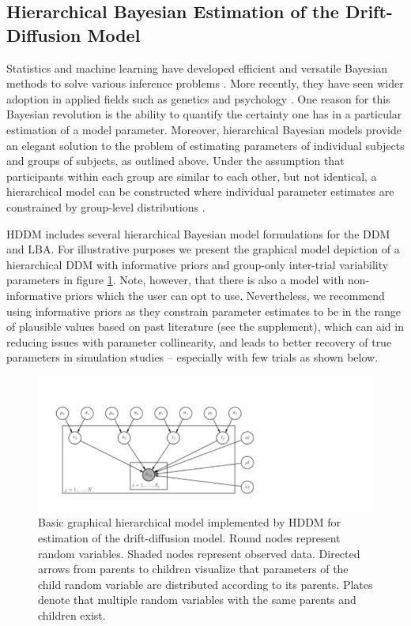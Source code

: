 \documentclass[letterpaper,10pt,english]{article}
\begin{document}
\subsection*{Hierarchical Bayesian Estimation of the Drift-Diffusion
Model}
\label{methods:hierarchical-bayesian-estimation}
Statistics and machine learning have developed efficient and versatile
Bayesian methods to solve various inference problems
\citep{Poirier06}. More recently, they have seen wider adoption in
applied fields such as genetics \citep{StephensBalding09} and
psychology \citep{ClemensDeSelenEtAl11}. One reason for this Bayesian
revolution is the ability to quantify the certainty one has in a
particular estimation of a model parameter. Moreover, hierarchical
Bayesian models provide an elegant solution to the problem of
estimating parameters of individual subjects and groups of subjects,
as outlined above. Under the assumption that participants within each
group are similar to each other, but not identical, a hierarchical
model can be constructed where individual parameter estimates are
constrained by group-level distributions
\citep{NilssonRieskampWagenmakers11,ShiffrinLeeKim08}.

HDDM includes several hierarchical Bayesian model formulations for the DDM and LBA. For illustrative purposes we present the graphical model depiction of a hierarchical DDM with informative priors and group-only inter-trial variability parameters in figure \ref{fig.graphical}. Note, however, that there is also a model with non-informative priors which the user can opt to use. Nevertheless, we recommend using informative priors as they constrain parameter estimates to be in the range of plausible values based on past literature \citep{MatzkeWagenmakers09} (see the supplement), which can aid in reducing issues with parameter collinearity, and leads to better recovery of true parameters in simulation studies -- especially with few trials as shown below.

\begin{figure}
\centering
\includegraphics[scale=.6]{graphical_hddm.pdf}
\caption{Basic graphical hierarchical model implemented by HDDM for
estimation of the drift-diffusion model. Round nodes represent random
variables. Shaded nodes represent observed data. Directed arrows from
parents to children visualize that parameters of the child random
variable are distributed according to its   parents. Plates denote
that multiple random variables with the same   parents and children
exist.}
\label{fig.graphical}
\end{figure}
\end{document}
